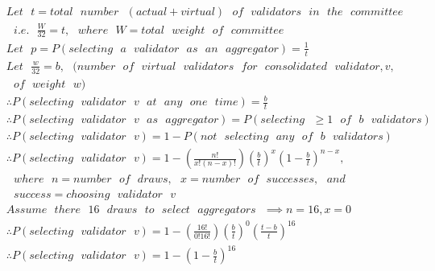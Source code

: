 \documentclass[UTF8]{article}
\begin{document}
\noindent
\begin{equation*}
\begin{split}
& Let \texttt{ } t = total  \texttt{ } number \texttt{ } (actual  + virtual)  \texttt{ } of \texttt{ } validators \texttt{ } in  \texttt{ }  the  \texttt{ } committee\\
& 
\texttt{                  } i.e. \texttt{ } \frac{W}{32} = t, \texttt{ } where \texttt{ } W = total \texttt{ } weight \texttt{ } of \texttt{ }committee\\
& 
Let  \texttt{ } p = P(selecting \texttt{ } a \texttt{ } validator \texttt{ } as \texttt{ } an \texttt{ } aggregator) = \frac{1}{t}\\
& 
Let \texttt{ }  \frac{w}{32} = b,   \texttt{ } (number \texttt{ } of \texttt{ } virtual \texttt{ }  validators \texttt{ }  for  \texttt{ } consolidated \texttt{ } validator,  v,\\
& 
\texttt{                  }  of  \texttt{ } weight \texttt{ }  w) \\
& 
\therefore P(selecting \texttt{ } validator \texttt{ } v \texttt{ } at \texttt{ } any \texttt{ } one \texttt{ } time) = \frac{b}{t}\\
& 
\therefore P(selecting \texttt{ }  validator \texttt{ } v \texttt{ } as \texttt{ }aggregator) =  P(selecting \texttt{ } \geqslant 1 \texttt{ } of \texttt{ } b \texttt{ } validators) \\
& 
\therefore P(selecting \texttt{ }  validator \texttt{ } v) = 1 - P(not \texttt{ } selecting \texttt{ } any \texttt{ } of \texttt{ } b  \texttt{ }validators) \\
& 
\therefore P(selecting \texttt{ }  validator \texttt{ } v) = 1 - \left(\frac{n!}{x!(n-x)!} \right) \left( \frac{b}{t} \right)^x \left( 1 - \frac{b}{t} \right)^{n-x}, \\
& 
\texttt{                  } where \texttt{ } n = number \texttt{ } of \texttt{ } draws, \texttt{ } x = number \texttt{ } of \texttt{ } successes, \texttt{ } and \\
&
 \texttt{                  }  success = choosing \texttt{ } validator \texttt{ } v\\
& 
Assume \texttt{ } there \texttt{ } 16 \texttt{ } draws \texttt{ } to \texttt{ } select \texttt{ } aggregators \texttt{ } \implies n = 16, x = 0\\
& 
\therefore P(selecting \texttt{ }  validator \texttt{ } v) = 1 - \left(\frac{16!}{0!16!} \right) \left( \frac{b}{t} \right)^0 \left(\frac{t - b}{t} \right)^{16} \\
& 
\therefore P(selecting \texttt{ }  validator \texttt{ } v) = 1 - \left( 1 - \frac{b}{t} \right)^{16} 
\end{split}
\end{equation*}
\end{document}
